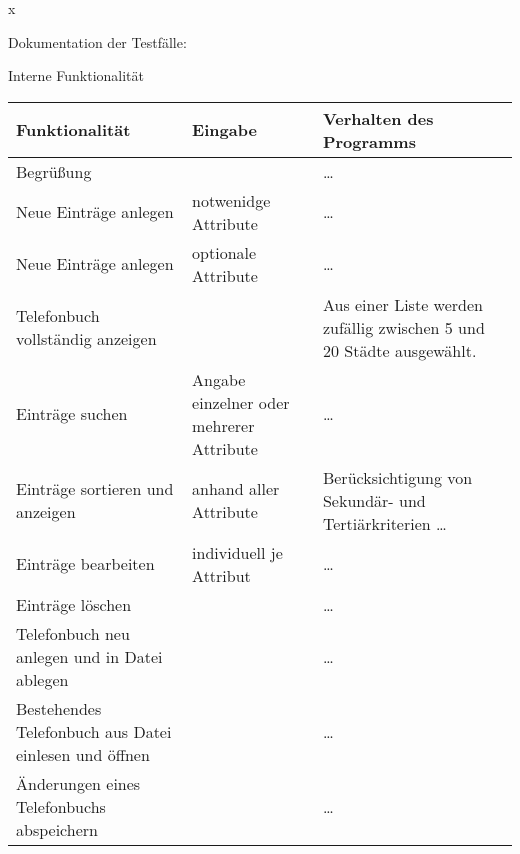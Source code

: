 \documentclass[a4paper]{article}
\begin{document}
\begin{exercise}{x}

Dokumentation der Testf\"alle:


\begin{center}

	{\Large Interne Funktionalit\"at} \\[2ex]

	\begin{tabular}{| p{2.5cm} | p{2.2cm} | p{10cm} |}
		\hline
		Funktionalit\"at & Eingabe & Verhalten des Programms\\ \hline \hline
		
		Begr\"u\ss{}ung & 
		& \dots \\ \hline
		
		Neue Eintr\"age \newline anlegen & notwenidge Attribute
		& \dots \\ \hline
		
		Neue Eintr\"age \newline anlegen & optionale Attribute
		& \dots \\ \hline
		
		Telefonbuch \newline vollst\"andig \newline anzeigen & 
		& Aus einer Liste werden zuf\"allig zwischen 5 und 20 St\"adte ausgew\"ahlt. \\ \hline
		
		Eintr\"age suchen & Angabe einzelner oder mehrerer Attribute
		& \dots \\ \hline
		
		Eintr\"age sortieren und anzeigen & anhand aller Attribute
		& Ber\"ucksichtigung von Sekund\"ar- und Terti\"arkriterien \dots \\ \hline
		
		Eintr\"age bearbeiten & individuell je Attribut
		& \dots \\ \hline
		
		Eintr\"age l\"oschen & 
		& \dots \\ \hline
		
		Telefonbuch neu anlegen und in Datei ablegen & 
		& \dots \\ \hline
		
		Bestehendes Telefonbuch aus Datei einlesen und \"offnen & 
		& \dots \\ \hline
		
		\"Anderungen eines Telefonbuchs abspeichern & 
		& \dots \\ \hline
		

\end{tabular}
\end{center}
\end{exercise}
\end{document}
